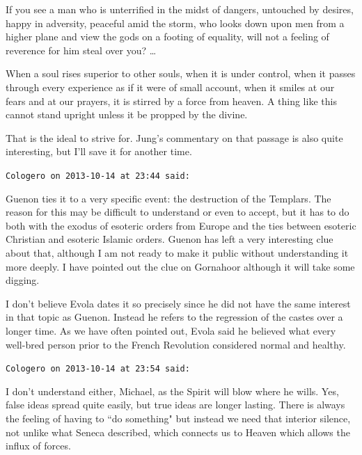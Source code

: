\begin{footnotesize}
\begin{sffamily}
\begin{quotex}
If you see a man who is unterrified in the midst of dangers, untouched by desires, happy in adversity, peaceful amid the storm, who looks down upon men from a higher plane and view the gods on a footing of equality, will not a feeling of reverence for him steal over you? …

When a soul rises superior to other souls, when it is under control, when it passes through every experience as if it were of small account, when it smiles at our fears and at our prayers, it is stirred by a force from heaven. A thing like this cannot stand upright unless it be propped by the divine. 

\end{quotex}
That is the ideal to strive for. Jung's commentary on that passage is also quite interesting, but I'll save it for another time.


\hfill

\texttt{Cologero on 2013-10-14 at 23:44 said: }

Guenon ties it to a very specific event: the destruction of the Templars. The reason for this may be difficult to understand or even to accept, but it has to do both with the exodus of esoteric orders from Europe and the ties between esoteric Christian and esoteric Islamic orders. Guenon has left a very interesting clue about that, although I am not ready to make it public without understanding it more deeply. I have pointed out the clue on Gornahoor although it will take some digging.

I don't believe Evola dates it so precisely since he did not have the same interest in that topic as Guenon. Instead he refers to the regression of the castes over a longer time. As we have often pointed out, Evola said he believed what every well-bred person prior to the French Revolution considered normal and healthy.


\hfill

\texttt{Cologero on 2013-10-14 at 23:54 said: }

I don't understand either, Michael, as the Spirit will blow where he wills. Yes, false ideas spread quite easily, but true ideas are longer lasting. There is always the feeling of having to ``do something" but instead we need that interior silence, not unlike what Seneca described, which connects us to Heaven which allows the influx of forces.


\hfill


\end{sffamily}\end{footnotesize}
